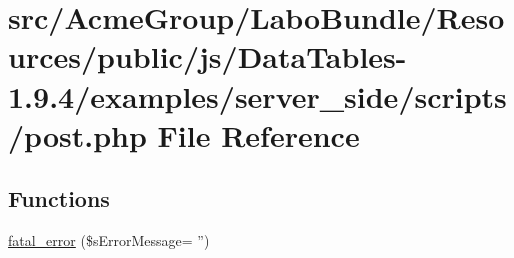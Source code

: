 \hypertarget{post_8php}{\section{src/\+Acme\+Group/\+Labo\+Bundle/\+Resources/public/js/\+Data\+Tables-\/1.9.4/examples/server\+\_\+side/scripts/post.php File Reference}
\label{post_8php}
}
\subsection*{Functions}
\begin{DoxyCompactItemize}
\item 
\hyperlink{post_8php_a1bb235f2e57f0389e14b11592d32119a}{fatal\+\_\+error} (\$s\+Error\+Message= '')
\end{DoxyCompactItemize}
